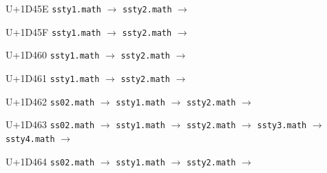 \documentclass{article}
\begin{document}
\begin{substitutions}
\goodbreak

U+1D45E  \linebreak
    \texttt{ssty1.math} $\to$  \linebreak
    \texttt{ssty2.math} $\to$  

\goodbreak

U+1D45F  \linebreak
    \texttt{ssty1.math} $\to$  \linebreak
    \texttt{ssty2.math} $\to$  

\goodbreak

U+1D460  \linebreak
    \texttt{ssty1.math} $\to$  \linebreak
    \texttt{ssty2.math} $\to$  

\goodbreak

U+1D461  \linebreak
    \texttt{ssty1.math} $\to$  \linebreak
    \texttt{ssty2.math} $\to$  

\goodbreak

U+1D462  \linebreak
    \texttt{ss02.math} $\to$  \linebreak
    \texttt{ssty1.math} $\to$  \linebreak
    \texttt{ssty2.math} $\to$  

\goodbreak

U+1D463  \linebreak
    \texttt{ss02.math} $\to$  \linebreak
    \texttt{ssty1.math} $\to$  \linebreak
    \texttt{ssty2.math} $\to$  \linebreak
    \texttt{ssty3.math} $\to$  \linebreak
    \texttt{ssty4.math} $\to$  

\goodbreak

U+1D464  \linebreak
    \texttt{ss02.math} $\to$  \linebreak
    \texttt{ssty1.math} $\to$  \linebreak
    \texttt{ssty2.math} $\to$  


\end{substitutions}
\end{document}

